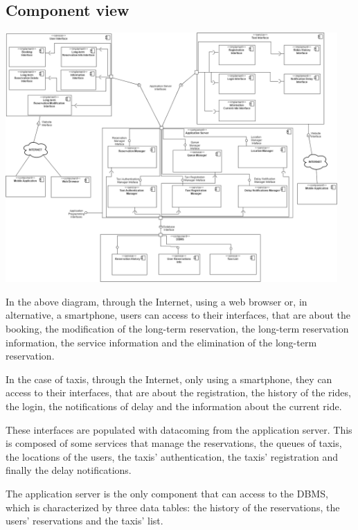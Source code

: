 \subsection{Component view}
	\begin{center}
		\includegraphics[width=0.95\textwidth]{./images/component_view.png}
	\end{center}
	
	In the above diagram, through the Internet, using a web browser or, in alternative, a smartphone, users can access to their interfaces, that are about the booking, the modification of the long-term reservation, the long-term reservation information, the service information and the elimination of the long-term reservation. 
	
	In the case of taxis, through the Internet, only using a smartphone, they can access to their interfaces, that are about the registration, the history of the rides, the login, the notifications of delay and the information about the current ride.
	
	These interfaces are populated with datacoming from the application server. This is composed of some services that manage the reservations, the queues of taxis, the locations of the users, the taxis' authentication, the taxis' registration and finally the delay notifications.
	
	The application server is the only component that can access to the DBMS, which is characterized by three data tables: the history of the reservations, the users' reservations and the taxis' list.
